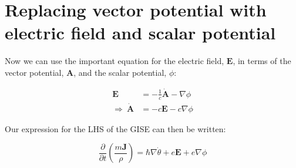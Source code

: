 
\section{Replacing vector potential with electric field and scalar potential}
\label{sec:electric}

Now we can use the important equation for the electric field, $\mathbf{E}$, in
terms of the vector potential, $\mathbf{A}$, and the scalar potential, $\phi$:

\begin{align}
    \mathbf{E} &= - \frac{1}{c} \mathbf{\dot A} - \nabla \phi \\
    \Rightarrow ~ \mathbf{\dot A} &= - c \mathbf{E} - c \nabla \phi
\end{align}

Our expression for the LHS of the GISE can then be written:

\begin{equation}
    \frac{\partial}{\partial t} \left( \frac{m \mathbf{J}}{\rho} \right) = \hbar
    \nabla \dot \theta + e \mathbf{E} + e \nabla \phi
    \label{eqn:mj-over-rho}
\end{equation}

